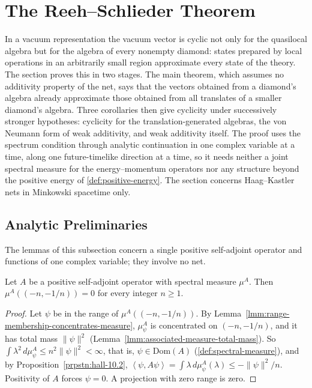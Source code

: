 \section{The Reeh--Schlieder Theorem}\label{sctn:reeh-schlieder}

In a vacuum representation the vacuum vector is cyclic not only for the quasilocal algebra but for the algebra of every nonempty diamond: states prepared by local operations in an arbitrarily small region approximate every state of the theory. The section proves this in two stages. The main theorem, which assumes no additivity property of the net, says that the vectors obtained from a diamond's algebra already approximate those obtained from all translates of a smaller diamond's algebra. Three corollaries then give cyclicity under successively stronger hypotheses: cyclicity for the translation-generated algebras, the von Neumann form of weak additivity, and weak additivity itself. The proof uses the spectrum condition through analytic continuation in one complex variable at a time, along one future-timelike direction at a time, so it needs neither a joint spectral measure for the energy--momentum operators nor any structure beyond the positive energy of \ref{def:positive-energy}. The section concerns Haag--Kastler nets in Minkowski spacetime only.

\subsection{Analytic Preliminaries}

The lemmas of this subsection concern a single positive self-adjoint operator and functions of one complex variable; they involve no net.

\begin{lemma}
    \label{lmm:positive-spectral-support-interval}
    \leanok
    Let $A$ be a positive self-adjoint operator with spectral measure $\mu^A$. Then $\mu^A((-n, -1/n)) = 0$ for every integer $n \ge 1$.
\end{lemma}
\begin{proof}
    \leanok
    Let $\psi$ be in the range of $\mu^A((-n, -1/n))$. By Lemma~\ref{lmm:range-membership-concentrates-measure}, $\mu^A_\psi$ is concentrated on $(-n, -1/n)$, and it has total mass $\|\psi\|^2$ (Lemma~\ref{lmm:associated-measure-total-mass}). So $\int \lambda^2 \, d\mu^A_\psi \le n^2\|\psi\|^2 < \infty$, that is, $\psi \in \text{Dom}(A)$ (\ref{def:spectral-measure}), and by Proposition~\ref{prpstn:hall-10.2}, $\left< \psi, A\psi \right> = \int \lambda \, d\mu^A_\psi(\lambda) \le -\|\psi\|^2/n$. Positivity of $A$ forces $\psi = 0$. A projection with zero range is zero.
\end{proof}

